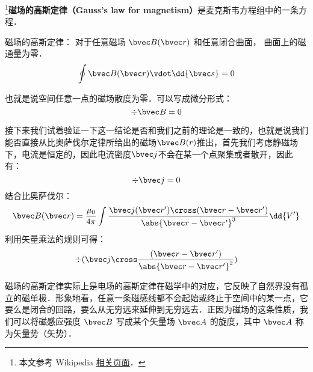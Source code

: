 
\begin{issues}
\issueDraft
\end{issues}


\footnote{本文参考 Wikipedia \href{https://en.wikipedia.org/wiki/Gauss's_law_for_magnetism}{相关页面}．}\textbf{磁场的高斯定律（Gauss's law for magnetism）}是麦克斯韦方程组中的一条方程．

磁场的高斯定律： 对于任意磁场 $\bvec B(\bvec r)$ 和任意闭合曲面， 曲面上的磁通量为零．
\begin{equation}
\oint \bvec B(\bvec r) \vdot \dd{\bvec s} = 0
\end{equation}

也就是说空间任意一点的磁场散度为零．可以写成微分形式：
\begin{equation}
\div\bvec B = 0
\end{equation}

接下来我们试着验证一下这一结论是否和我们之前的理论是一致的，也就是说我们能否直接从比奥萨伐尔定律所给出的磁场$\bvec B(r)$推出，首先我们考虑静磁场下，电流是恒定的，因此电流密度$\bvec j$不会在某一个点聚集或者散开，因此有：
\begin{equation}
\div \bvec j = 0  
\end{equation}
结合比奥萨伐尔：
\begin{equation}
\bvec B(\bvec r) = \frac{\mu_0}{4\pi} \int \frac{\bvec j(\bvec r') \cross (\bvec r - \bvec r')}{\abs{\bvec r - \bvec r'}^3} \dd{V'}
\end{equation}
利用矢量乘法的规则可得：
\begin{equation}
\div(\bvec j \cross \frac{(\bvec r - \bvec r')}{\abs{\bvec r - \bvec r'}^2})
\end{equation}


磁场的高斯定律实际上是电场的高斯定律在磁学中的对应，它反映了自然界没有孤立的磁单极．形象地看，任意一条磁感线都不会起始或终止于空间中的某一点，它要么是闭合的回路，要么从无穷远来延伸到无穷远去．正因为磁场的这条性质，我们可以将磁感应强度 $\bvec B$ 写成某个矢量场 $\bvec A$ 的旋度，其中 $\bvec A$ 称为矢量势（矢势）．